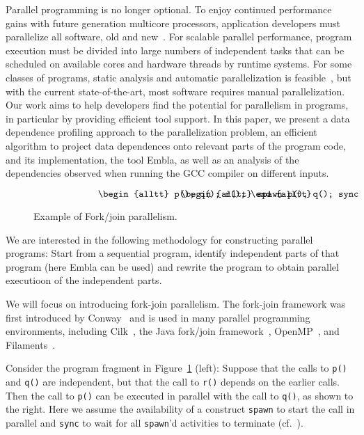\documentclass[times, 10pt,twocolumn]{article}
\begin{document}
Parallel programming is no longer optional.  To enjoy continued
performance gains with future generation multicore processors,
application developers must parallelize all software, old and
new~\cite{TEL95,ONHWC96,KAB03,VIAVAC05}.  For scalable parallel
performance, program execution must be divided into large numbers of
independent tasks that can be scheduled on available cores and hardware
threads by runtime systems.  For some classes of programs, static
analysis and automatic parallelization is feasible~\cite{KA02}, but with
the current state-of-the-art, most software requires manual
parallelization.  Our work aims to help developers find the potential
for parallelism in programs, in particular by providing efficient tool
support.  In this paper, we present a data dependence profiling approach
to the parallelization problem, an efficient algorithm to project data
dependences onto relevant parts of the program code, and its
implementation, the tool Embla, as well as an analysis of the dependencies 
observed when running the GCC compiler on different inputs.

\begin{figure}
\small
\hrulefill
\[
\begin{minipage}[t]{3cm}
\begin{alltt}
   p();
   q();
   r();
\end{alltt}
\end{minipage}
\begin{minipage}[t]{3cm}
\begin{alltt}
   spawn p();
   q();
   sync;
   r();
\end{alltt}
\end{minipage} 
\]
\hrulefill
\caption{Example of Fork/join parallelism.}
\label{fforkjoin}
\end{figure}

We are interested in the following methodology for constructing
parallel programs: Start from a sequential program, identify
independent parts of that program (here Embla can be used) and rewrite
the program to obtain parallel executioon of the independent parts.

We will focus on introducing
fork-join parallelism. The fork-join framework was first introduced
by Conway~\cite{Conway63} and is used in many parallel
programming environments,
including Cilk~\cite{BJKLR96}, the Java fork/join
framework~\cite{Lea00}, OpenMP~\cite{DM98}, and Filaments~\cite{LF00}.

Consider the program fragment in
Figure~\ref{fforkjoin} (left):
Suppose that the calls to {\tt p()} and {\tt q()} are independent,
but that the call to {\tt r()} depends on the earlier calls. Then
the call to {\tt p()} can be
executed in parallel with
the call to {\tt q()}, as shown to the right.
Here we assume the availability of a construct {\tt spawn} to start
the call in parallel and {\tt sync} to wait for all {\tt spawn}'d
activities to terminate (cf.~\cite{BJKLR96}).
\end{document}
